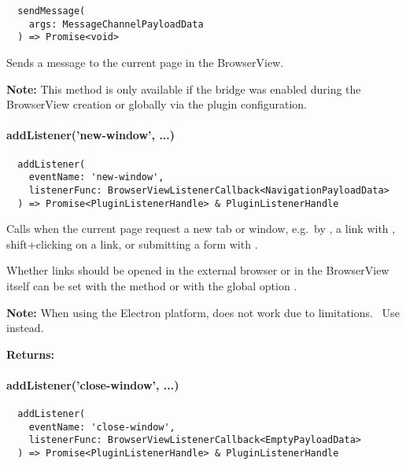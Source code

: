 \begin{verbatim}
  sendMessage(
    args: MessageChannelPayloadData
  ) => Promise<void>
\end{verbatim}

Sends a message to the current page in the BrowserView.

\textbf{Note:} This method is only available if the bridge was enabled during the BrowserView creation or globally via the plugin configuration.



\paragraph{addListener('new-window', ...)}

\begin{verbatim}
  addListener(
    eventName: 'new-window',
    listenerFunc: BrowserViewListenerCallback<NavigationPayloadData>
  ) => Promise<PluginListenerHandle> & PluginListenerHandle
\end{verbatim}

Calls  when the current page request a new tab or window, e.g.\ by ,
a link with , shift+clicking on a link, or submitting a form with .

Whether links should be opened in the external browser or in the BrowserView itself can be set with
the method  or with the global option .

\textbf{Note:} When using the Electron platform,  does not work due to limitations.~\cite{capacitor-electron}
Use  instead.

\textbf{Returns:} 



\paragraph{addListener('close-window', ...)}

\begin{verbatim}
  addListener(
    eventName: 'close-window',
    listenerFunc: BrowserViewListenerCallback<EmptyPayloadData>
  ) => Promise<PluginListenerHandle> & PluginListenerHandle
\end{verbatim}


